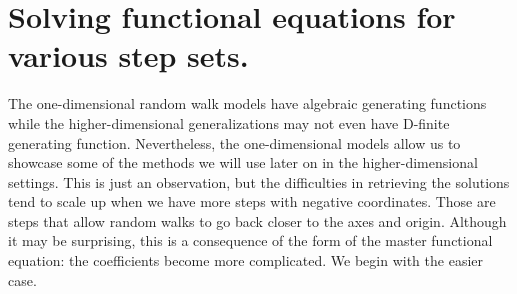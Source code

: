 \section{Solving functional equations for various step sets.}
\label{sec:Solving1D}
The one-dimensional random walk models have algebraic generating functions while the higher-dimensional generalizations may not even have D-finite generating function. Nevertheless, the one-dimensional models allow us to showcase some of the methods we will use later on in the higher-dimensional settings. This is just an observation, but the difficulties in retrieving the solutions tend to scale up when we have more steps with negative coordinates. Those are steps that allow random walks to go back closer to the axes and origin. Although it may be surprising, this is a consequence of the form of the master functional equation: the coefficients become more complicated. We begin with the easier case.
